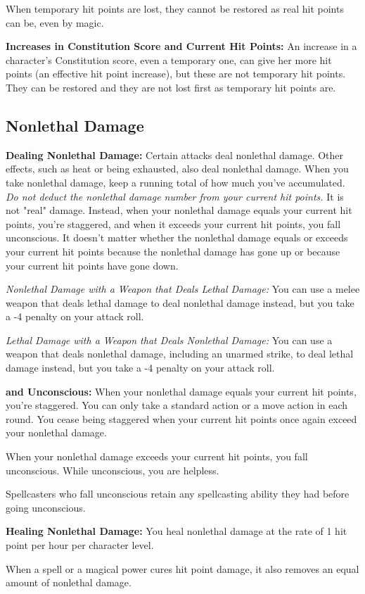 When temporary hit points are lost, they cannot be restored as real hit points 
can be, even by magic.

\textbf{Increases in Constitution Score and Current Hit Points:} An increase in 
a character's Constitution score, even a temporary one, can give her more hit points 
(an effective hit point increase), but these are not temporary hit points. They 
can be restored and they are not lost first as temporary hit points are.

\subsection{Nonlethal Damage}

\textbf{Dealing Nonlethal Damage:} Certain attacks deal nonlethal damage. Other 
effects, such as heat or being exhausted, also deal nonlethal damage. When you 
take nonlethal damage, keep a running total of how much you've accumulated. \textit{Do 
not deduct the nonlethal damage number from your current hit points.} It is not 
"real" damage. Instead, when your nonlethal damage equals your current hit points, 
you're staggered, and when it exceeds your current hit points, you fall unconscious. 
It doesn't matter whether the nonlethal damage equals or exceeds your current hit 
points because the nonlethal damage has gone up or because your current hit points 
have gone down.

\textit{Nonlethal Damage with a Weapon that Deals Lethal Damage:} You can use a 
melee weapon that deals lethal damage to deal nonlethal damage instead, but you 
take a -4 penalty on your attack roll.

\textit{Lethal Damage with a Weapon that Deals Nonlethal Damage:} You can use a 
weapon that deals nonlethal damage, including an unarmed strike, to deal lethal 
damage instead, but you take a -4 penalty on your attack roll.

\textbf{ and Unconscious:} When your nonlethal damage equals your current 
hit points, you're staggered. You can only take a standard action or a move action 
in each round. You cease being staggered when your current hit points once again 
exceed your nonlethal damage.

When your nonlethal damage exceeds your current hit points, you fall unconscious. 
While unconscious, you are helpless.

Spellcasters who fall unconscious retain any spellcasting ability they had before 
going unconscious.

\textbf{Healing Nonlethal Damage:} You heal nonlethal damage at the rate of 1 hit 
point per hour per character level.

When a spell or a magical power cures hit point damage, it also removes an equal 
amount of nonlethal damage.
